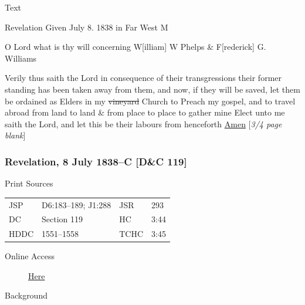 				\begin{description}
					\item[Text]
				\end{description}
				
					Revelation Given July 8. 1838 in Far West M
					
					O Lord what is thy will concerning W[illiam] W Phelps \& F[rederick] G. Williams
					
					Verily thus saith the Lord in consequence of their transgressions their former standing has been taken away from them, and now, if they will be saved, let them be ordained as Elders in my \sout{vineyard} Church to Preach my gospel, and to travel abroad from land to land \& from place to place to gather mine Elect unto me saith the Lord, and let this be their labours from henceforth \uline{Amen} [\textit{3/4 page blank}]
					
		\subsubsection{Revelation, 8 July 1838--C [D\&C 119]}
			\label{EMS-1838-JS-8-JUL-1838-C}
			
			\begin{description}
					\item[Print Sources]
				\end{description}

					\begin{tabular}{p{0.5in}p{1in}p{0.5in}p{1in}}
					JSP	 	& D6:183--189; J1:288				& JSR 		& 293 \\
					DC	 	& Section 119		& HC 		& 3:44 \\
					HDDC 	& 1551--1558		& TCHC 		& 3:45 \\
					\end{tabular}
				
				\begin{description}
					\item[Online Access] \href{https://www.josephsmithpapers.org/paper-summary/revelation-8-july-1838-c-dc-119/1}{Here}
				\end{description}
				
				\begin{description}
					\item[Background]
				\end{description}
				
